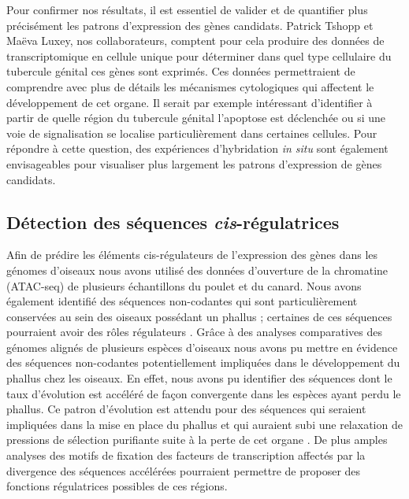 Pour confirmer nos résultats, il est essentiel de valider et de quantifier plus précisément les patrons d’expression des gènes candidats. Patrick Tshopp et  Maëva Luxey, nos collaborateurs, comptent pour cela produire des données de transcriptomique en cellule unique pour déterminer dans quel type cellulaire du tubercule génital ces gènes sont exprimés. Ces données permettraient de comprendre avec plus de détails les mécanismes cytologiques qui affectent le développement de cet organe. Il serait par exemple intéressant d’identifier à partir de quelle région du tubercule génital l’apoptose est déclenchée ou si une voie de signalisation se localise particulièrement dans certaines cellules. Pour répondre à cette question, des expériences d’hybridation \textit{in situ} sont également envisageables pour visualiser plus largement les patrons d’expression de gènes candidats. 

\subsection{Détection des séquences \textit{cis}-régulatrices}

Afin de prédire les éléments \gls{cis}-régulateurs de l’expression des gènes dans les génomes d’oiseaux nous avons utilisé des données d’ouverture de la chromatine (ATAC-seq) de plusieurs échantillons du poulet et du canard. Nous avons également identifié des séquences non-codantes qui sont particulièrement conservées au sein des oiseaux possédant un phallus ; certaines de ces séquences pourraient avoir des rôles régulateurs \citep{sackton_convergent_2019, zhu_three_2021}. Grâce à des analyses comparatives des génomes alignés de plusieurs espèces d’oiseaux \citep{feng_dense_2020} nous avons pu mettre en évidence des séquences non-codantes potentiellement impliquées dans le développement du phallus chez les oiseaux. En effet, nous avons pu identifier des séquences dont le taux d’évolution est accéléré de façon convergente dans les espèces ayant perdu le phallus. Ce patron d’évolution est attendu pour des séquences qui seraient impliquées dans la mise en place du phallus et qui auraient subi une relaxation de pressions de sélection purifiante suite à la perte de cet organe \citep{hiller_forward_2012}. De plus amples analyses des motifs de fixation des facteurs de transcription affectés par la divergence des séquences accélérées pourraient permettre de proposer des fonctions régulatrices possibles de ces régions. \\

